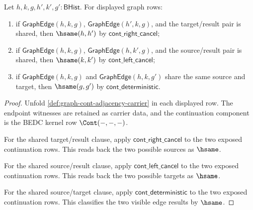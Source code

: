 \begin{theorem}
\label{thm:graph-cont-edge-row-inversion}
Let $h,k,g,h',k',g':\mathsf{BHist}$. For displayed graph rows:
\begin{enumerate}
\item if $\mathsf{GraphEdge}(h,k,g)$, $\mathsf{GraphEdge}(h',k,g)$, and the
target/result pair is shared, then $\hsame(h,h')$ by
$\mathsf{cont\_right\_cancel}$;
\item if $\mathsf{GraphEdge}(h,k,g)$, $\mathsf{GraphEdge}(h,k',g)$, and the
source/result pair is shared, then $\hsame(k,k')$ by
$\mathsf{cont\_left\_cancel}$;
\item if $\mathsf{GraphEdge}(h,k,g)$ and $\mathsf{GraphEdge}(h,k,g')$ share
the same source and target, then $\hsame(g,g')$ by
$\mathsf{cont\_deterministic}$.
\end{enumerate}
\end{theorem}
\begin{proof}
Unfold \autoref{def:graph-cont-adjacency-carrier} in each displayed row. The
endpoint witnesses are retained as carrier data, and the continuation component
is the BEDC kernel row $\Cont(-,-,-)$.

For the shared target/result clause, apply
$\mathsf{cont\_right\_cancel}$ to the two exposed continuation rows. This
reads back the two possible sources as $\hsame$.

For the shared source/result clause, apply
$\mathsf{cont\_left\_cancel}$ to the two exposed continuation rows. This reads
back the two possible targets as $\hsame$.

For the shared source/target clause, apply
$\mathsf{cont\_deterministic}$ to the two exposed continuation rows. This
classifies the two visible edge results by $\hsame$.
\end{proof}

